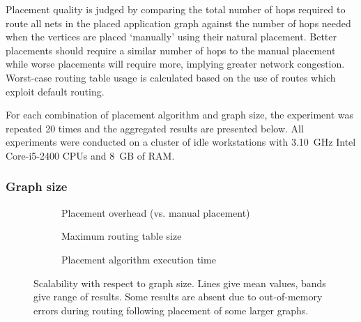 			Placement quality is judged by comparing the total number of hops
			required to route all nets in the placed application graph against the
			number of hops needed when the vertices are placed `manually' using their
			natural placement. Better placements should require a similar number of
			hops to the manual placement while worse placements will require more,
			implying greater network congestion. Worst-case routing table usage is
			calculated based on the use of routes which exploit default routing.
			
			For each combination of placement algorithm and graph size, the
			experiment was repeated 20 times and the aggregated results are presented
			below. All experiments were conducted on a cluster of idle workstations
			with 3.10~GHz Intel Core-i5-2400 CPUs and 8~GB of RAM.
			
			\subsubsection{Graph size}
				
				\begin{figure}
					\center
					\begin{subfigure}{\linewidth}
						\center
						
						\caption{Placement overhead (vs. manual placement)}
						\label{fig:placement-scalability-size-quality}
					\end{subfigure}
					
					\vspace*{1em}
					
					\begin{subfigure}{\linewidth}
						\center
						
						\caption{Maximum routing table size}
						\label{fig:placement-scalability-size-entries}
					\end{subfigure}
					
					\vspace*{1em}
					
					\begin{subfigure}{\linewidth}
						\center
						
						\caption{Placement algorithm execution time}
						\label{fig:placement-scalability-size-runtime}
					\end{subfigure}
					
					\caption[Placer scalability with respect to graph size.]%
					{Scalability with respect to graph size. Lines give mean
					values, bands give range of results. Some results are absent due to
					out-of-memory errors during routing following placement of some
					larger graphs.}
					\label{fig:placement-scalability-size}
				\end{figure}
				

